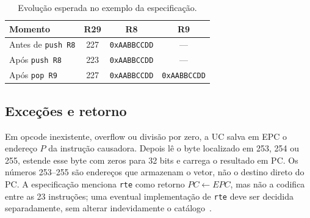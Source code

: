 \begin{table}[H]\centering
\caption{Evolução esperada no exemplo da especificação.}\label{tab:exemplo-pilha}
\begin{tabular}{@{}lccc@{}}\toprule
Momento & R29 & R8 & R9 \\\midrule
Antes de \texttt{push R8} & 227 & \texttt{0xAABBCCDD} & --- \\
Após \texttt{push R8} & 223 & \texttt{0xAABBCCDD} & --- \\
Após \texttt{pop R9} & 227 & \texttt{0xAABBCCDD} & \texttt{0xAABBCCDD} \\\bottomrule
\end{tabular}
\end{table}

\subsection{Exceções e retorno}\label{subsec:excecoes}

Em opcode inexistente, overflow ou divisão por zero, a UC salva em EPC o endereço $P$ da instrução causadora. Depois lê o byte localizado em 253, 254 ou 255, estende esse byte com zeros para 32 bits e carrega o resultado em PC. Os números 253--255 são endereços que armazenam o vetor, não o destino direto do PC. A especificação menciona \texttt{rte} como retorno $PC\gets EPC$, mas não a codifica entre as 23 instruções; uma eventual implementação de \texttt{rte} deve ser decidida separadamente, sem alterar indevidamente o catálogo~\cite{especificacao}.

\begin{landscape}
\end{landscape}
